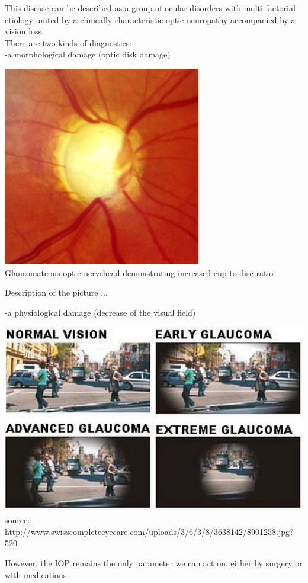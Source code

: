 \documentclass[9pt]{beamer}
\begin{document}
\begin{frame}
This disease can be described as a group of ocular disorders with multi-factorial etiology united by a clinically characteristic optic neuropathy accompanied by a vision loss.
\newline
\\
There are two kinds of diagnostics: \\
-a morphological damage (optic disk damage)
\begin{center}
\includegraphics[scale=.5]{Morphological.jpg}\\
\tiny{Glaucomateous optic nervehead demonstrating increased cup to disc ratio}
\end{center}
Description of the picture ...
\end{frame}
\begin{frame}
-a physiological damage (decrease of the visual field)
\begin{center}
\includegraphics[scale=.5]{Glaucoma.jpg}\\
\tiny{source: \url{http://www.swisscompleteeyecare.com/uploads/3/6/3/8/3638142/8901258.jpg?520}}

\end{center}

However, the IOP remains the only parameter we can act on, either by surgery or with medications.
\end{frame}
\end{document}
